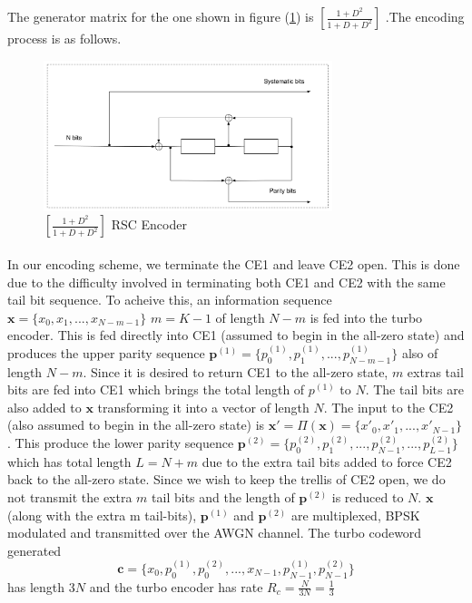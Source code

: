 \documentclass[20 pts]{article}
\begin{document}
 The generator matrix for the one shown in figure (\ref{RSC})
 is $[\frac{1+D^2}{1+D+D^2}]$ .The encoding process is as follows.

\begin{figure}[h!]
\centering
		\includegraphics[width=0.75\textwidth]{RSCExample3.pdf}
		\caption{$[\frac{1+D^2}{1+D+D^2}]$  RSC Encoder}
		\label{RSC}
		\end{figure}

\paragraph{}
In our encoding scheme, we terminate the CE1 and leave CE2 open. This is done due
to the difficulty involved in terminating both CE1 and CE2 with the same tail bit 
sequence.
To acheive this,	
 an information sequence $\mathbf{x}=\{x_0,x_1,...,x_{N-m-1} \} $
$m=K-1$
of length $N-m$ is fed into the turbo encoder. This is fed directly into CE1 (assumed to 
begin in the all-zero state) and produces the upper parity sequence 
$\mathbf{p}^{(1)}=\{p^{(1)}_0,p^{(1)}_1,...,p^{(1)}_{N-m-1} \}$ also of 
length $N-m$. 
Since it is desired to return CE1 to the all-zero state, $m$ extras tail bits 
are fed into CE1 which brings the total length of $p^{(1)}$ to $N$. The tail bits are
also added to $\mathbf{x}$ transforming it into a vector of length $N$.
The input to the CE2 (also assumed to 
begin in the all-zero state) is 
$\mathbf{x'}=\Pi(\mathbf{x})= \{x'_0,x'_1,...,x'_{N-1} \} $. This produce the lower 
parity sequence 
$\mathbf{p}^{(2)}=\{p^{(2)}_0,p^{(2)}_1,...,p^{(2)}_{N-1},...,p^{(2)}_{L-1} \}$
 which has total length $L=N+m$ due to the extra tail bits added to force CE2 back to the
 all-zero state. Since we wish to keep the trellis of CE2 open, we do not transmit the
 extra $m$ tail bits and the length of $\mathbf{p}^{(2)}$ is reduced to $N$.
 $\mathbf{x}$ (along with the extra m tail-bits), $\mathbf{p}^{(1)}$
 and $\mathbf{p}^{(2)}$ are multiplexed, BPSK modulated and transmitted over the
 AWGN channel.
 The turbo codeword generated  
 $$\mathbf{c}=\{x_0,p^{(1)}_0,p^{(2)}_0,...,x_{N-1},p^{(1)}_{N-1},p^{(2)}_{N-1} \} $$ 
 has length $3N$ and the
 turbo encoder has rate $R_c=\frac{N}{3N} = \frac{1}{3}$
 
\end{document}

